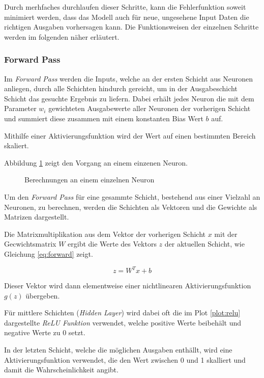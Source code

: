 Durch merhfaches durchlaufen dieser Schritte, 
kann die Fehlerfunktion soweit minimiert werden, dass 
das Modell auch für neue, ungesehene Input Daten 
die richtigen Ausgaben vorhersagen kann.
Die Funktionsweisen der einzelnen Schritte 
werden im folgenden näher erläutert.


\subsubsection{Forward Pass}
Im \textit{Forward Pass} werden die Inputs, welche an der 
ersten Schicht aus Neuronen anliegen, durch alle Schichten hindurch 
gereicht, um in der Ausgabeschicht Schicht
das gesuchte Ergebnis zu liefern.
Dabei erhält jedes Neuron die mit dem Parameter $w_{i}$ gewichteten
Ausgabewerte aller Neuronen der vorherigen Schicht und summiert diese
zusammen mit einem konstanten Bias Wert $b$ auf.

Mithilfe einer Aktivierungsfunktion wird der Wert auf
einen bestimmten Bereich skaliert.

Abbildung \ref{fig:neuron} zeigt den Vorgang an einem einzenen 
Neuron.

\vspace{1cm}
\begin{figure}[H]
    \centering
    
    \caption{Berechnungen an einem einzelnen Neuron}
    \label{fig:neuron}
\end{figure}
\vspace{1cm}

Um den \textit{Forward Pass} für eine gesammte Schicht, bestehend aus 
einer Vielzahl an Neuronen, zu berechnen, werden die Schichten 
als Vektoren und die Gewichte als Matrizen dargestellt.

Die Matrixmultiplikation aus dem Vektor der vorherigen 
Schicht $x$ mit der Gecwichtsmatrix $W$ ergibt die Werte
des Vektors $z$ der aktuellen Schicht, wie Gleichung 
\ref{eq:forward} zeigt.

\begin{equation}
    \label{eq:forward}
    z = W^{T}x+b
\end{equation}


Dieser Vektor wird dann elementweise einer nichtlinearen
Aktivierungsfunktion $g(z)$ übergeben.

Für mittlere Schichten (\textit{Hidden Layer}) wird dabei
oft die im Plot \ref{plot:relu} dargestellte \textit{ReLU Funktion}
verwendet, welche positive Werte beibehält und negative 
Werte zu 0 setzt.

In der letzten Schicht, welche die möglichen 
Ausgaben enthällt, wird eine Aktivierungsfunktion
verwendet, die den Wert zwischen 0 und 1 
skalliert und damit die Wahrscheinlichkeit angibt.

